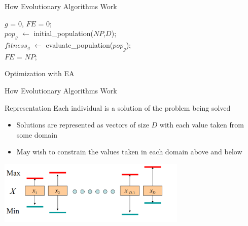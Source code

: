 \begin{frame}[c,fragile]{How Evolutionary Algorithms Work}
\begin{algorithm}[H]
	\BlankLine
	$g$ = 0, $FE$ = 0;\\
	\pause
	$pop_g$ $\leftarrow$ initial\_population($NP$,$D$); \\
	$fitness_g$ $\leftarrow$ evaluate\_population($pop_g$); \\
	$FE$ = $NP$; \\
	\pause
	\caption{Optimization with EA}
\end{algorithm}



\end{frame}

\begin{frame}{How Evolutionary Algorithms Work}
\begin{center}

\begin{block}{Representation}
Each individual is a solution of the problem being solved 
\begin{itemize}
    \item Solutions are represented as vectors of size $D$ with each value taken from some domain
    \item May wish to constrain the values taken in each domain above and below
\end{itemize}
\end{block}

\includegraphics[width=9cm]{new_images/EAs_rep.png} 

\end{center}
\end{frame}

